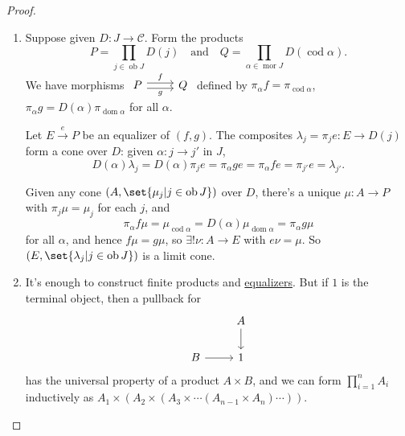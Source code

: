 \documentclass{article}
\DeclareMathOperator{\ob}{ob}
\DeclareMathOperator{\mor}{mor}
\DeclareMathOperator{\dom}{dom}
\DeclareMathOperator{\cod}{cod}
\let\to\longrightarrow
\begin{document}
\begin{proof}\leavevmode
  \begin{enumerate}[label=(\roman*)]
    \item Suppose given $D: J \to \mathscr{C}$.
      Form the products
      \begin{equation*}
        P = \prod_{j \in \ob J} D(j) \quad \text{and}\quad
        Q = \prod_{\alpha\in\mor J} D(\cod \alpha).
      \end{equation*}
    We have morphisms $\begin{tikzcd}P \rar[shift left]{f} \rar[shift right,']{g} & Q\end{tikzcd}$ defined by $\pi_\alpha f = \pi_{\cod \alpha}$, $\pi_\alpha g = D(\alpha) \pi_{\dom \alpha}$ for all $\alpha$.

    Let $E \overset{e}\to P$ be an equalizer of $(f,g)$.
    The composites $\lambda_j = \pi_j e: E \to D(j)$ form a cone over $D$:
    given $\alpha: j \to j'$ in $J$,
    \begin{equation*}
      D(\alpha) \lambda_j = D(\alpha) \pi_j e = \pi_\alpha g e = \pi_\alpha f e = \pi_{j'} e = \lambda_{j'}.
    \end{equation*}

    Given any cone $(A, \set{\mu_j | j \in \ob J})$ over $D$, there's a unique $\mu: A \to P$ with $\pi_j \mu = \mu_j$ for each $j$, and
    \begin{equation*}
      \pi_\alpha f \mu = \mu_{\cod \alpha} = D(\alpha) \mu_{\dom \alpha} = \pi_\alpha g \mu
    \end{equation*}
    for all $\alpha$, and hence $f\mu = g\mu$, so $\exists ! \nu: A \to E$ with $e \nu = \mu$.
    So $(E, \set{\lambda_j | j \in \ob J})$ is a limit cone.
  \item It's enough to construct finite products and \hyperlink{def:equalizer}{equalizers}.
    But if $1$ is the terminal object, then a pullback for
    \begin{equation*}
      \begin{tikzcd}
        & A \dar \\
        B \rar & 1
      \end{tikzcd}
    \end{equation*}
    has the universal property of a product $A \times B$, and we can form $\prod_{i=1}^n A_i$ inductively as $A_1 \times (A_2 \times (A_3 \times \dotsm (A_{n-1} \times A_n) \dotsm)).$


\end{enumerate}
\end{proof}
\end{document}
